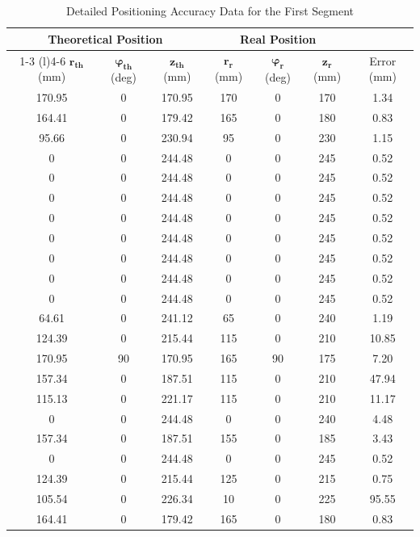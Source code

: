 \documentclass[conference]{IEEEtran}
\begin{document}
\begin{table}[h] %

\captionsetup{skip=10pt}
\centering

\caption{Detailed Positioning Accuracy Data for the First Segment}
\label{tab:segment1_error_data} %

\begin{tabular}{@{}ccccccc@{}}
\toprule
\multicolumn{3}{c}{Theoretical Position} & \multicolumn{3}{c}{Real Position} & \\
\cmidrule(r){1-3} \cmidrule(l){4-6}
$\boldsymbol{r_{th}}$ (mm) & $\boldsymbol{\varphi_{th}}$ (deg) & $\boldsymbol{z_{th}}$ (mm) & $\boldsymbol{r_{r}}$ (mm) & $\boldsymbol{\varphi_{r}}$ (deg) & $\boldsymbol{z_{r}}$ (mm) & Error (mm) \\
\midrule
170.95 & 0 & 170.95 & 170 & 0 & 170 & 1.34 \\
164.41 & 0 & 179.42 & 165 & 0 & 180 & 0.83 \\
95.66  & 0 & 230.94 & 95  & 0 & 230 & 1.15 \\
0      & 0 & 244.48 & 0   & 0 & 245 & 0.52 \\
0      & 0 & 244.48 & 0   & 0 & 245 & 0.52 \\
0      & 0 & 244.48 & 0   & 0 & 245 & 0.52 \\
0      & 0 & 244.48 & 0   & 0 & 245 & 0.52 \\
0      & 0 & 244.48 & 0   & 0 & 245 & 0.52 \\
0      & 0 & 244.48 & 0   & 0 & 245 & 0.52 \\
0      & 0 & 244.48 & 0   & 0 & 245 & 0.52 \\
0      & 0 & 244.48 & 0   & 0 & 245 & 0.52 \\
64.61  & 0 & 241.12 & 65  & 0 & 240 & 1.19 \\
124.39 & 0 & 215.44 & 115 & 0 & 210 & 10.85 \\
170.95 & 90& 170.95 & 165 & 90& 175 & 7.20 \\
157.34 & 0 & 187.51 & 115 & 0 & 210 & 47.94 \\
115.13 & 0 & 221.17 & 115 & 0 & 210 & 11.17 \\
0      & 0 & 244.48 & 0   & 0 & 240 & 4.48 \\
157.34 & 0 & 187.51 & 155 & 0 & 185 & 3.43 \\
0      & 0 & 244.48 & 0   & 0 & 245 & 0.52 \\
124.39 & 0 & 215.44 & 125 & 0 & 215 & 0.75 \\
105.54 & 0 & 226.34 & 10  & 0 & 225 & 95.55 \\
164.41 & 0 & 179.42 & 165 & 0 & 180 & 0.83 \\
\bottomrule
\end{tabular}


\end{table}
\end{document}
